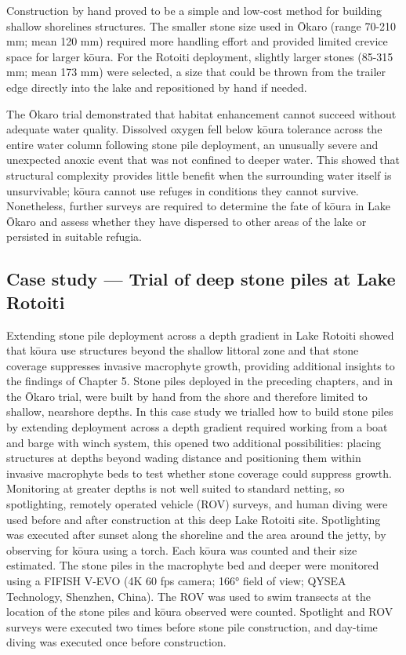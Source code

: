 \documentclass[
  12pt,
  a4paper,
  oneside]{scrbook}
\begin{document}
Construction by hand proved to be a simple and low-cost method for
building shallow shorelines structures. The smaller stone size used in
Ōkaro (range 70-210 mm; mean 120 mm) required more handling effort and
provided limited crevice space for larger kōura. For the Rotoiti
deployment, slightly larger stones (85-315 mm; mean 173 mm) were
selected, a size that could be thrown from the trailer edge directly
into the lake and repositioned by hand if needed.

The Ōkaro trial demonstrated that habitat enhancement cannot succeed
without adequate water quality. Dissolved oxygen fell below kōura
tolerance across the entire water column following stone pile
deployment, an unusually severe and unexpected anoxic event that was not
confined to deeper water. This showed that structural complexity
provides little benefit when the surrounding water itself is
unsurvivable; kōura cannot use refuges in conditions they cannot
survive. Nonetheless, further surveys are required to determine the fate
of kōura in Lake Ōkaro and assess whether they have dispersed to other
areas of the lake or persisted in suitable refugia.

\subsection{Case study --- Trial of deep stone piles at Lake
Rotoiti}\label{sec-supp-rotoiti-deep}

Extending stone pile deployment across a depth gradient in Lake Rotoiti
showed that kōura use structures beyond the shallow littoral zone and
that stone coverage suppresses invasive macrophyte growth, providing
additional insights to the findings of Chapter 5. Stone piles deployed
in the preceding chapters, and in the Ōkaro trial, were built by hand
from the shore and therefore limited to shallow, nearshore depths. In
this case study we trialled how to build stone piles by extending
deployment across a depth gradient required working from a boat and
barge with winch system, this opened two additional possibilities:
placing structures at depths beyond wading distance and positioning them
within invasive macrophyte beds to test whether stone coverage could
suppress growth. Monitoring at greater depths is not well suited to
standard netting, so spotlighting, remotely operated vehicle (ROV)
surveys, and human diving were used before and after construction at
this deep Lake Rotoiti site. Spotlighting was executed after sunset
along the shoreline and the area around the jetty, by observing for
kōura using a torch. Each kōura was counted and their size estimated.
The stone piles in the macrophyte bed and deeper were monitored using a
FIFISH V-EVO (4K 60 fps camera; 166° field of view; QYSEA Technology,
Shenzhen, China). The ROV was used to swim transects at the location of
the stone piles and kōura observed were counted. Spotlight and ROV
surveys were executed two times before stone pile construction, and
day-time diving was executed once before construction.
\end{document}
